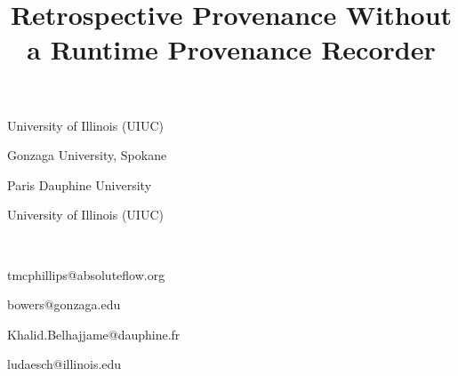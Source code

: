 \documentclass[nocopyrightspace]{sigplanconf}
\begin{document}
\title{Retrospective Provenance Without a Runtime Provenance Recorder}

{
  \begin{minipage}{1.0\linewidth}
    \begin{minipage}{0.24\linewidth} \centering
      University of Illinois (UIUC)
    \end{minipage}
    \begin{minipage}{0.24\linewidth} \centering
      Gonzaga University, Spokane
    \end{minipage}
    \begin{minipage}{0.24\linewidth} \centering
      Paris Dauphine University 
    \end{minipage}
    \begin{minipage}{0.24\linewidth} \centering
      University of Illinois (UIUC)
    \end{minipage}    
  \end{minipage}
}
{
$\,$\\
  \vspace{-4mm}
  \begin{minipage}{1.0\linewidth}
    \begin{minipage}{0.24\linewidth} \centering
      tmcphillips@absoluteflow.org
    \end{minipage}
    \begin{minipage}{0.24\linewidth} \centering
      bowers@gonzaga.edu
    \end{minipage}
    \begin{minipage}{0.24\linewidth} \centering
       Khalid.Belhajjame@dauphine.fr
    \end{minipage}
    \begin{minipage}{0.24\linewidth} \centering
      ludaesch@illinois.edu
    \end{minipage}
  \end{minipage}
}
\end{document}
